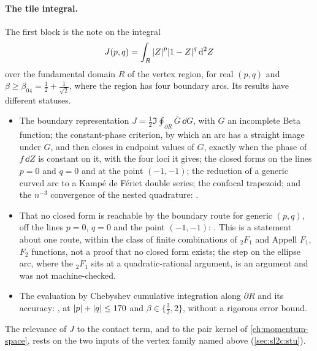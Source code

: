 \paragraph{The tile integral.}
The first block is the note on the integral
\begin{equation*}
  J(p, q)
    = \int_R {|Z|}^p {|1 - Z|}^q \, \mathrm{d}^2 Z
\end{equation*}
over the fundamental domain $R$ of the vertex region, for real $(p, q)$ and $\beta \ge \beta_{04} = \frac{1}{2} + \frac{1}{\sqrt{2}}$, where the region has four boundary arcs.
Its results have different statuses.
\begin{itemize}
  \item The boundary representation $J = \frac{1}{2} \Im \oint_{\partial R} \overline{G} \, \dd G$, with $G$ an incomplete Beta function; the constant-phase criterion, by which an arc has a straight image under $G$, and then closes in endpoint values of $G$, exactly when the phase of $f \, \dd Z$ is constant on it, with the four loci it gives; the closed forms on the lines $p = 0$ and $q = 0$ and at the point $(-1, -1)$; the reduction of a generic curved arc to a Kampé de Fériet double series; the confocal trapezoid; and the $n^{-3}$ convergence of the nested quadrature: .
  \item That no closed form is reachable by the boundary route for generic $(p, q)$, off the lines $p = 0$, $q = 0$ and the point $(-1, -1)$: .
    This is a statement about one route, within the class of finite combinations of ${}_2F_1$ and Appell $F_1$, $F_2$ functions, not a proof that no closed form exists; the step on the ellipse arc, where the ${}_2F_1$ sits at a quadratic-rational argument, is an argument and was not machine-checked.
  \item The evaluation by Chebyshev cumulative integration along $\partial R$ and its accuracy: , at ${|p|} + {|q|} \le 170$ and $\beta \in \{ \frac{3}{2}, 2 \}$, without a rigorous error bound.
\end{itemize}
The relevance of $J$ to the contact term, and to the pair kernel of \cref{ch:momentum-space}, rests on the two inputs of the vertex family named above (\cref{sec:sl2c:stu}).

